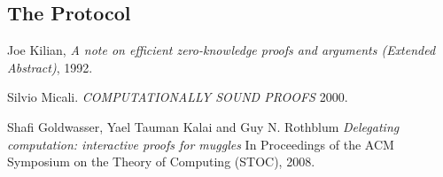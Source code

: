 \documentclass{article}
\begin{document}
\subsection{The Protocol}


\begin{thebibliography}{9}

    Joe Kilian,
    \emph{A note on efficient zero-knowledge proofs and arguments (Extended Abstract)},
    1992.

    Silvio Micali.
    \emph{COMPUTATIONALLY SOUND PROOFS}
    2000.

    Shafi Goldwasser, Yael Tauman Kalai and Guy N. Rothblum
    \emph{Delegating computation: interactive proofs for muggles}
    In Proceedings of the ACM Symposium on the Theory of Computing (STOC),
    2008.

\end{thebibliography}
\end{document}
